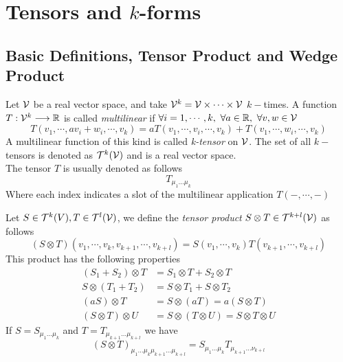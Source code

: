 \documentclass[../complete.tex]{subfiles}
\begin{document}
\section{Tensors and $k$-forms}
\subsection{Basic Definitions, Tensor Product and Wedge Product}
\begin{dfn}
	Let $\mathcal{V}$ be a real vector space, and take $\mathcal{V}^k=\mathcal{V}\times\cdots\times\mathcal{V}$ $k-$times. A function $T:\mathcal{V}^k\overset{}{\longrightarrow}\mathbb{R}$ is called \textit{multilinear} if $\forall i=1,\cdots,k,\ \forall a\in\mathbb{R},\ \forall v,w\in\mathcal{V}$
	\begin{equation}
		T(v_1,\cdots,av_i+w_i,\cdots,v_k)=aT(v_1,\cdots,v_i,\cdots,v_k)+T(v_1,\cdots,w_i,\cdots,v_k)
		\label{eq:multilinearapp}
	\end{equation}
	A multilinear function of this kind is called \textit{k-tensor} on $\mathcal{V}$. The set of all $k-$tensors is denoted as $\mathcal{T}^k(\mathcal{V})$ and is a real vector space.\\
	The tensor $T$ is usually denoted as follows
	\begin{equation}
		T_{\mu_1\ldots\mu_k}
		\label{eq:ktensordef}
	\end{equation}
	Where each index indicates a slot of the multilinear application $T(-,\cdots,-)$
\end{dfn}
\begin{dfn}
	Let $S\in\mathcal{T}^k(V),T\in\mathcal{T}^l(\mathcal{V})$, we define the \textit{tensor product} $S\otimes T\in\mathcal{T}^{k+l}(\mathcal{V})$ as follows
	\begin{equation}
		(S\otimes T)(v_1,\cdots,v_k,v_{k+1},\cdots,v_{k+l})=S(v_1,\cdots,v_k)T(v_{k+1},\cdots,v_{k+l})
		\label{eq:tensorprod}
	\end{equation}
	This product has the following properties
	\begin{equation}
		\begin{aligned}
			\left( S_1+S_2 \right)\otimes T&=S_1\otimes T+S_2\otimes T\\
			S\otimes(T_1+T_2)&=S\otimes T_1+S\otimes T_2\\
			(aS)\otimes T&=S\otimes(aT)=a(S\otimes T)\\
			(S\otimes T)\otimes U&= S\otimes(T\otimes U)=S\otimes T\otimes U
		\end{aligned}
		\label{eq:properties}
	\end{equation}
	If $S=S_{\mu_1\ldots\mu_k}$ and $T=T_{\mu_{k+1}\ldots\mu_{k+l}}$ we have
	\begin{equation}
		(S\otimes T)_{\mu_1\ldots\mu_k\mu_{k+1}\ldots\mu_{k+l}}=S_{\mu_1\ldots\mu_k}T_{\mu_{k+1}\ldots\nu_{k+l}}
		\label{eq:tensorprodein}
	\end{equation}
\end{dfn}
\end{document}
